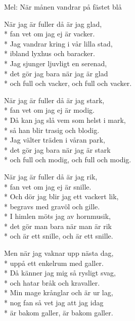 \begin{SongText}
    \begin{SongInfo}
        Mel: När månen vandrar på fästet blå
    \end{SongInfo}
    \begin{SongVerse}
        När jag är fuller då är jag glad,\\*%
        fan vet om jag ej är vacker.\\*%
        Jag vandrar kring i vår lilla stad,\\*%
        ibland lyxhus och baracker.\\*%
        Jag sjunger ljuvligt en serenad,\\*%
        det gör jag bara när jag är glad\\*%
        och full och vacker, och full och vacker.
    \end{SongVerse}
    \begin{SongVerse}
        När jag är fuller då är jag stark,\\*%
        fan vet om jag ej är modig.\\*%
        Då kan jag slå vem som helst i mark,\\*%
        så han blir trasig och blodig.\\*%
        Jag välter träden i våran park,\\*%
        det gör jag bara när jag är stark\\*%
        och full och modig, och full och modig.
    \end{SongVerse}
    \begin{SongVerse}
        När jag är fuller då är jag rik,\\*%
        fan vet om jag ej är snille.\\*%
        Och dör jag blir jag ett vackert lik,\\*%
        begravs med gravöl och gille.\\*%
        I himlen möts jag av hornmusik,\\*%
        det gör man bara när man är rik\\*%
        och är ett snille, och är ett snille.
    \end{SongVerse}
    \begin{SongVerse}
        Men när jag vaknar upp nästa dag,\\*%
        uppå ett enkelrum med galler.\\*%
        Då känner jag mig så rysligt svag,\\*%
        och hatar bråk och kravaller.\\*%
        Min mage krånglar och är ur lag,\\*%
        nog fan så vet jag att jag idag\\*%
        är bakom galler, är bakom galler.
    \end{SongVerse}
\end{SongText}
